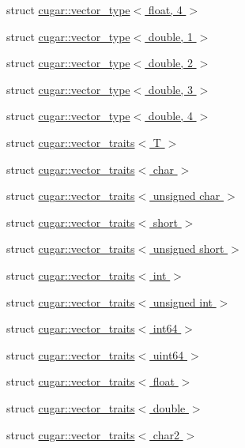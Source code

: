 \begin{DoxyCompactItemize}
\item 
struct \hyperlink{structcugar_1_1vector__type_3_01float_00_014_01_4}{cugar\+::vector\+\_\+type$<$ float, 4 $>$}
\item 
struct \hyperlink{structcugar_1_1vector__type_3_01double_00_011_01_4}{cugar\+::vector\+\_\+type$<$ double, 1 $>$}
\item 
struct \hyperlink{structcugar_1_1vector__type_3_01double_00_012_01_4}{cugar\+::vector\+\_\+type$<$ double, 2 $>$}
\item 
struct \hyperlink{structcugar_1_1vector__type_3_01double_00_013_01_4}{cugar\+::vector\+\_\+type$<$ double, 3 $>$}
\item 
struct \hyperlink{structcugar_1_1vector__type_3_01double_00_014_01_4}{cugar\+::vector\+\_\+type$<$ double, 4 $>$}
\item 
struct \hyperlink{structcugar_1_1vector__traits}{cugar\+::vector\+\_\+traits$<$ T $>$}
\item 
struct \hyperlink{structcugar_1_1vector__traits_3_01char_01_4}{cugar\+::vector\+\_\+traits$<$ char $>$}
\item 
struct \hyperlink{structcugar_1_1vector__traits_3_01unsigned_01char_01_4}{cugar\+::vector\+\_\+traits$<$ unsigned char $>$}
\item 
struct \hyperlink{structcugar_1_1vector__traits_3_01short_01_4}{cugar\+::vector\+\_\+traits$<$ short $>$}
\item 
struct \hyperlink{structcugar_1_1vector__traits_3_01unsigned_01short_01_4}{cugar\+::vector\+\_\+traits$<$ unsigned short $>$}
\item 
struct \hyperlink{structcugar_1_1vector__traits_3_01int_01_4}{cugar\+::vector\+\_\+traits$<$ int $>$}
\item 
struct \hyperlink{structcugar_1_1vector__traits_3_01unsigned_01int_01_4}{cugar\+::vector\+\_\+traits$<$ unsigned int $>$}
\item 
struct \hyperlink{structcugar_1_1vector__traits_3_01int64_01_4}{cugar\+::vector\+\_\+traits$<$ int64 $>$}
\item 
struct \hyperlink{structcugar_1_1vector__traits_3_01uint64_01_4}{cugar\+::vector\+\_\+traits$<$ uint64 $>$}
\item 
struct \hyperlink{structcugar_1_1vector__traits_3_01float_01_4}{cugar\+::vector\+\_\+traits$<$ float $>$}
\item 
struct \hyperlink{structcugar_1_1vector__traits_3_01double_01_4}{cugar\+::vector\+\_\+traits$<$ double $>$}
\item 
struct \hyperlink{structcugar_1_1vector__traits_3_01char2_01_4}{cugar\+::vector\+\_\+traits$<$ char2 $>$}

\end{DoxyCompactItemize}
